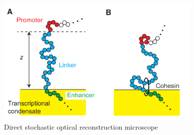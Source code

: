 \documentclass{article}
\begin{document}
\clearpage
\begin{figure}
\centering
\includegraphics[width=10cm]{Model.png}
\caption{Direct stochastic optical reconstruction microscope}
\end{figure}





 
\end{document}
